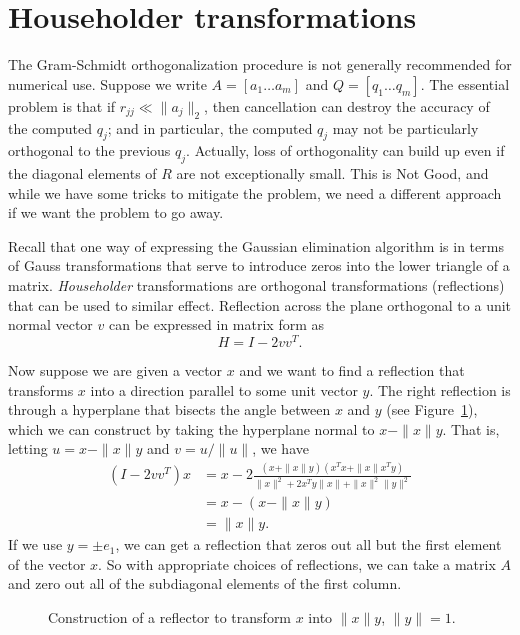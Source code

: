 \documentclass[12pt, leqno]{article}
\begin{document}
\section*{Householder transformations}

The Gram-Schmidt orthogonalization procedure is not generally
recommended for numerical use.  Suppose we write $A = [a_1 \ldots
  a_m]$ and $Q = [q_1 \ldots q_m]$.  The essential problem is that if
$r_{jj} \ll \|a_j\|_2$, then cancellation can destroy the accuracy of
the computed $q_j$; and in particular, the computed $q_j$ may not be
particularly orthogonal to the previous $q_j$.  Actually, loss of
orthogonality can build up even if the diagonal elements of $R$ are
not exceptionally small.  This is Not Good, and while we have some
tricks to mitigate the problem, we need a different approach if we
want the problem to go away.

Recall that one way of expressing the Gaussian elimination algorithm
is in terms of Gauss transformations that serve to introduce zeros
into the lower triangle of a matrix.  {\em Householder} transformations
are orthogonal transformations (reflections) that can be used to similar
effect.  Reflection across the plane orthogonal to a unit normal
vector $v$ can be expressed in matrix form as
\[
  H = I-2 vv^T.
\]

Now suppose we are given a vector $x$ and we want to find a reflection
that transforms $x$ into a direction parallel to some unit vector $y$.
The right reflection is through a hyperplane that bisects the angle
between $x$ and $y$ (see Figure~\ref{fig1}), which we can construct
by taking the hyperplane normal to $x-\|x\|y$.  That is,
letting $u = x - \|x\|y$ and $v = u/\|u\|$, we have
\begin{align*}
  (I-2vv^T)x
  & = x - 2\frac{(x+\|x\|y)(x^T x + \|x\| x^T y)}{\|x\|^2 + 2 x^T y \|x\| + \|x\|^2 \|y\|^2} \\
  & = x - (x-\|x\|y) \\
  & = \|x\|y.
\end{align*}
If we use $y = \pm e_1$, we can get a reflection that zeros out all but the
first element of the vector $x$.  So with appropriate choices of reflections,
we can take a matrix $A$ and zero out all of the subdiagonal elements
of the first column.

\begin{figure}
\begin{center}
\end{center}
\caption{Construction of a reflector to transform $x$ into $\|x\|y$,
         $\|y\| = 1$.}
\label{fig1}
\end{figure}
\end{document}
